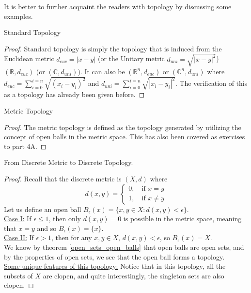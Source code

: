 \noindent It is better to further acquaint the readers with topology by discussing some examples.
\begin{Example}\label{standard_topology}
    Standard Topology
\end{Example}
\begin{proof}
    Standard topology is simply the topology that is induced from the Euclidean metric $d_{euc}=|x-y|$ (or the Unitary metric $d_{uni}=\sqrt{|x-y|^2}$) $(\mathbb{R},d_{euc})$ (or $(\mathbb{C},d_{uni})$). It can also be $(\mathbb{R}^n,d_{euc})$ or $(\mathbb{C}^n,d_{uni})$ where $d_{euc}=\sum_{i=0}^{i=n} \sqrt{(x_i-y_i)^2}$ and $d_{uni}=\sum_{i=0}^{i=n}\sqrt{|x_i-y_i|^2}$. The verification of this as a topology has already been given before.
\end{proof}
\begin{Example}\label{metric_topology}
	Metric Topology
\end{Example}
\begin{proof}
	The metric topology is defined as the topology generated by utilizing the concept of open balls in the metric space. This has also been covered as exercises to part 4A.
\end{proof}
\begin{Example}\label{discrete_topology}
    From Discrete Metric to Discrete Topology.
\end{Example}
\begin{proof}
    Recall that the discrete metric is $(X,d)$ where
    $$d(x,y)=\begin{cases}
        0,\quad \text{if }x=y\\
        1,\quad \text{if }x\neq y
    \end{cases}$$
    Let us define an open ball $B_{\epsilon}(x)=\{x,y\in X:d(x,y)<\epsilon\}$.\\
    \underline{Case I:} If $\epsilon\leq1$, then only $d(x,y)=0$ is possible in the metric space, meaning that $x=y$ and so $B_{\epsilon}(x)=\{x\}$.\\
    \underline{Case II:} If $\epsilon>1$, then for any $x,y\in X$, $d(x,y)<\epsilon$, so $B_{\epsilon}(x)=X$.\\
    We know by theorem \eqref{open_sets_open_balls} that open balls are open sets, and by the properties of open sets, we see that the open ball forms a topology.\\
    \underline{Some unique features of this topology:} Notice that in this topology, all the subsets of $X$ are clopen, and quite interestingly, the singleton sets are also clopen.
\end{proof}
